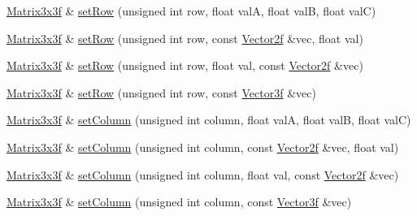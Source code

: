 \begin{DoxyCompactItemize}
\item 
\hyperlink{classh2_1_1_matrix3x3f}{Matrix3x3f} \& \hyperlink{classh2_1_1_matrix3x3f_a69fd7976a76dc1600b31a53b5f77edeb}{set\-Row} (unsigned int row, float val\-A, float val\-B, float val\-C)
\item 
\hyperlink{classh2_1_1_matrix3x3f}{Matrix3x3f} \& \hyperlink{classh2_1_1_matrix3x3f_a91e2bc8ab24f7539b41ed00861dca959}{set\-Row} (unsigned int row, const \hyperlink{classh2_1_1_vector2f}{Vector2f} \&vec, float val)
\item 
\hyperlink{classh2_1_1_matrix3x3f}{Matrix3x3f} \& \hyperlink{classh2_1_1_matrix3x3f_accc958906676a67612ede559b8a34ca2}{set\-Row} (unsigned int row, float val, const \hyperlink{classh2_1_1_vector2f}{Vector2f} \&vec)
\item 
\hyperlink{classh2_1_1_matrix3x3f}{Matrix3x3f} \& \hyperlink{classh2_1_1_matrix3x3f_af8276c23a7b7a4a94f1ac04e528a9930}{set\-Row} (unsigned int row, const \hyperlink{classh2_1_1_vector3f}{Vector3f} \&vec)
\item 
\hyperlink{classh2_1_1_matrix3x3f}{Matrix3x3f} \& \hyperlink{classh2_1_1_matrix3x3f_a5116544b57e474338438b6bb628fd177}{set\-Column} (unsigned int column, float val\-A, float val\-B, float val\-C)
\item 
\hyperlink{classh2_1_1_matrix3x3f}{Matrix3x3f} \& \hyperlink{classh2_1_1_matrix3x3f_a282949a6b69cb7a893d5164be6f6c4fb}{set\-Column} (unsigned int column, const \hyperlink{classh2_1_1_vector2f}{Vector2f} \&vec, float val)
\item 
\hyperlink{classh2_1_1_matrix3x3f}{Matrix3x3f} \& \hyperlink{classh2_1_1_matrix3x3f_a39a735112ff5b8c0b483169bd96ff2e3}{set\-Column} (unsigned int column, float val, const \hyperlink{classh2_1_1_vector2f}{Vector2f} \&vec)
\item 
\hyperlink{classh2_1_1_matrix3x3f}{Matrix3x3f} \& \hyperlink{classh2_1_1_matrix3x3f_a7347da5662c5bb1e79517c3ed4b21724}{set\-Column} (unsigned int column, const \hyperlink{classh2_1_1_vector3f}{Vector3f} \&vec)
\end{DoxyCompactItemize}
